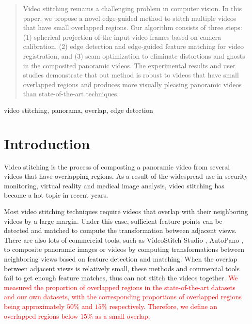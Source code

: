 \documentclass[conference]{IEEEtran}
\begin{document}
\begin{abstract}
Video stitching remains a challenging problem in computer vision. In this paper, we propose a novel edge-guided method to stitch multiple videos that have small overlapped regions.
Our algorithm consists of three steps: (1) spherical projection of the input video frames based on camera calibration, (2) edge detection and edge-guided feature matching for video registration, 
and (3) seam optimization to eliminate distortions and ghosts in the composited panoramic videos. 
%
The experimental results and user studies 
demonstrate that out method is robust to videos that have small overlapped regions and produces more visually pleasing panoramic videos than state-of-the-art techniques.
\end{abstract}

\begin{IEEEkeywords}
video stitching, panorama, overlap, edge detection
\end{IEEEkeywords}

\section{Introduction}
\label{sec:intro}

Video stitching is the process of composting a panoramic video from several videos that have overlapping regions.
As a result of the widespread
use in security monitoring, virtual reality and medical image
analysis, video stitching has become a hot topic in recent years.

Most video stitching techniques \cite{zheng2008stitching, guo2016joint, Jiang_2015_CVPR_Workshops, nie2018dynamic} require videos that overlap with
their neighboring videos by a large margin.
Under this case, sufficient feature points can be detected and matched to compute the transformation between adjacent views.
There are also lots of commercial tools, such as VideoStitch Studio \cite{videostitching}, AutoPano \cite{autopano}, to composite panoramic images or videos by computing transformations between neighboring views based on feature detection and matching.
When the overlap between adjacent views is relatively small, these methods and commercial tools fail to get enough feature matches, thus can not stitch the videos together.
\textcolor{red}{We measured the proportion of overlapped regions in the state-of-the-art datasets and our own datasets, 
with the corresponding proportions of overlapped regions being approximately $50\%$ and $15\%$ respectively.
Therefore, we define an overlapped regions below $15\%$ as a small overlap.}
\end{document}
